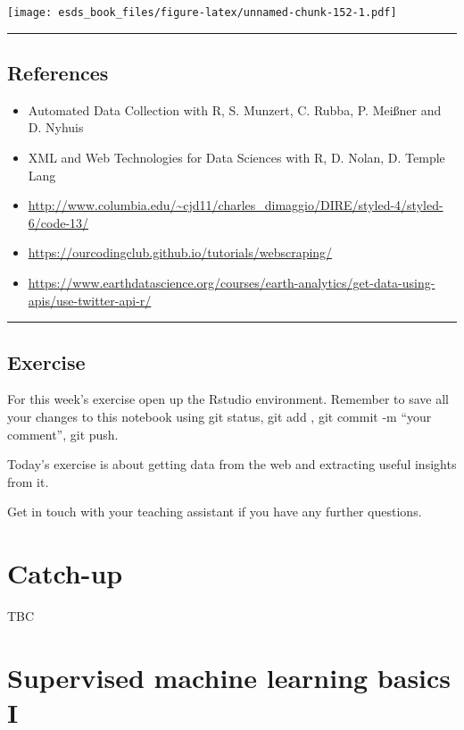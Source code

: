 \documentclass[
]{book}
\providecommand{\tightlist}{%
  \setlength{\itemsep}{0pt}\setlength{\parskip}{0pt}}
\begin{document}
\texttt{[image: esds\_book\_files/figure-latex/unnamed-chunk-152-1.pdf]}

\begin{center}\rule{0.5\linewidth}{0.5pt}\end{center}

\hypertarget{references}{%
\section{References}\label{references}}

\begin{itemize}
\tightlist
\item
  Automated Data Collection with R, S. Munzert, C. Rubba, P. Meißner and D. Nyhuis
\item
  XML and Web Technologies for Data Sciences with R, D. Nolan, D. Temple Lang
\item
  \url{http://www.columbia.edu/~cjd11/charles_dimaggio/DIRE/styled-4/styled-6/code-13/}
\item
  \url{https://ourcodingclub.github.io/tutorials/webscraping/}
\item
  \url{https://www.earthdatascience.org/courses/earth-analytics/get-data-using-apis/use-twitter-api-r/}
\end{itemize}

\begin{center}\rule{0.5\linewidth}{0.5pt}\end{center}

\hypertarget{exercise}{%
\section{Exercise}\label{exercise}}

For this week's exercise open up the Rstudio environment. Remember to save all your changes to this notebook using git status, git add , git commit -m ``your comment'', git push.

Today's exercise is about getting data from the web and extracting useful insights from it.

Get in touch with your teaching assistant if you have any further questions.

\hypertarget{catch-up}{%
\chapter{Catch-up}\label{catch-up}}

TBC

\hypertarget{supervised-machine-learning-basics-i}{%
\chapter{Supervised machine learning basics I}\label{supervised-machine-learning-basics-i}}
\end{document}
